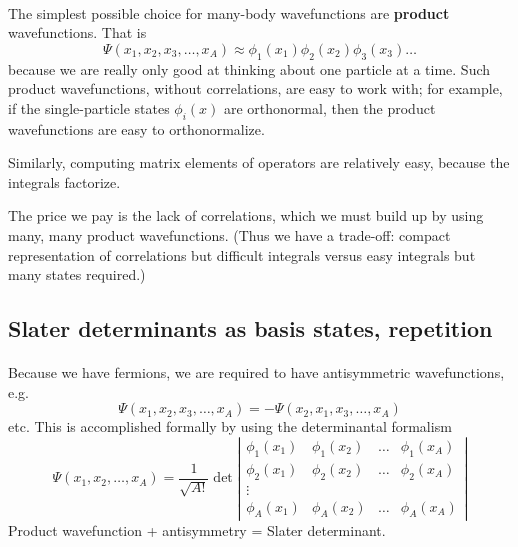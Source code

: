 \documentclass[%
twoside,                 %
final,                   %
10pt]{article}
\begin{document}
\paragraph{}
The simplest possible choice for many-body wavefunctions are \textbf{product} wavefunctions.
That is
\[ 
\Psi(x_1, x_2, x_3, \ldots, x_A) \approx \phi_1(x_1) \phi_2(x_2) \phi_3(x_3) \ldots
\]
because we are really only good  at thinking about one particle at a time. Such 
product wavefunctions, without correlations, are easy to 
work with; for example, if the single-particle states $\phi_i(x)$ are orthonormal, then 
the product wavefunctions are easy to orthonormalize.   

Similarly, computing matrix elements of operators are relatively easy, because the 
integrals factorize.


The price we pay is the lack of correlations, which we must build up by using many, many product 
wavefunctions. (Thus we have a trade-off: compact representation of correlations but 
difficult integrals versus easy integrals but many states required.)



\subsection{Slater determinants as basis states, repetition}

\paragraph{}
Because we have fermions, we are required to have antisymmetric wavefunctions, e.g.
\[
\Psi(x_1, x_2, x_3, \ldots, x_A) = - \Psi(x_2, x_1, x_3, \ldots, x_A)
\]
etc. This is accomplished formally by using the determinantal formalism
\[
\Psi(x_1, x_2, \ldots, x_A) 
= \frac{1}{\sqrt{A!}} 
\det \left | 
\begin{array}{cccc}
\phi_1(x_1) & \phi_1(x_2) & \ldots & \phi_1(x_A) \\
\phi_2(x_1) & \phi_2(x_2) & \ldots & \phi_2(x_A) \\
 \vdots & & &  \\
\phi_A(x_1) & \phi_A(x_2) & \ldots & \phi_A(x_A) 
\end{array}
\right |
\]
Product wavefunction + antisymmetry = Slater determinant.
\end{document}
